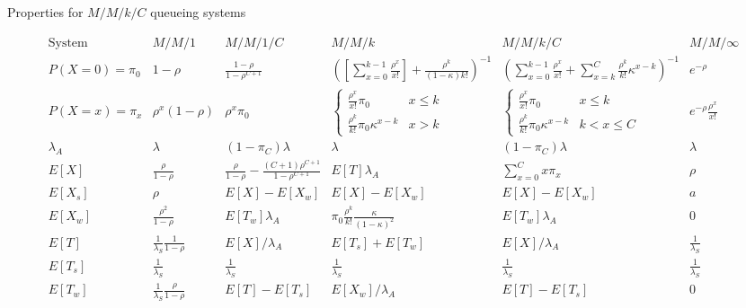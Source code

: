 \documentclass{article}
\newcommand{\utilization}{\rho}
\begin{document}
{\renewcommand{\arraystretch}{1.5}
\begin{sidewaystable}
\caption{Properties for $M/M/k/C$ queueing systems}
\label{tab:properties}
\[ \begin{array}{c|ccccc}
\mbox{System} & M/M/1 & M/M/1/C & M/M/k & M/M/k/C & M/M/\infty \\
\hline
P(X=0)=\pi_0 & 1-\utilization & \frac{1-\utilization}{1-\utilization^{C+1}} & 
\left(\left[\sum_{x=0}^{k-1} \frac{\utilization^x}{x!}\right] + \frac{\utilization^k}{(1-\kappa)k!}\right)^{-1} &
\left(\sum_{x=0}^{k-1} \frac{\utilization^x}{x!} + \sum_{x=k}^C \frac{\utilization^k}{k!}\kappa^{x-k} \right)^{-1} 
& e^{-\utilization} \\
P(X=x)=\pi_x & \utilization^x (1-\utilization) & \utilization^x \pi_0 & \left\{ \begin{array}{ll} \frac{\utilization^x}{x!}\pi_0 & x\le k \\ \frac{\utilization^k}{k!}\pi_0 \kappa^{x-k} & x>k \end{array} \right. 
& \left\{ \begin{array}{ll} \frac{\utilization^x}{x!}\pi_0 & x\le k \\ \frac{\utilization^k}{k!} \pi_0\kappa ^{x-k} & k<x\le C \end{array} \right.   & e^{-\utilization} \frac{\utilization^x}{x!} \\
\hline
\lambda_A & \lambda & (1-\pi_C)\lambda & \lambda & (1-\pi_C)\lambda & \lambda \\
\hline
E[X] & \frac{\utilization}{1-\utilization} & \frac{\utilization}{1-\utilization} - \frac{(C+1)\utilization^{C+1}}{1-\utilization^{C+1}} & E[T]\lambda_A & \sum_{x=0}^C x \pi_x & \utilization \\
E[X_s] & \utilization & E[X]-E[X_w] & E[X]-E[X_w] & E[X]-E[X_w] & a \\
E[X_w] & \frac{\utilization^2}{1-\utilization} & E[T_w] \lambda_A & \pi_0 \frac{\utilization^k}{k!} \frac{\kappa}{(1-\kappa)^2} & E[T_w] \lambda_A& 0 \\
E[T] & \frac{1}{\lambda_S}\frac{1}{1-\utilization} & E[X]/\lambda_A & E[T_s]+E[T_w] & E[X]/\lambda_A & \frac{1}{\lambda_S} \\
E[T_s] & \frac{1}{\lambda_S} & \frac{1}{\lambda_S} & \frac{1}{\lambda_S} & \frac{1}{\lambda_S} & \frac{1}{\lambda_S} \\
E[T_w] & \frac{1}{\lambda_S}\frac{\utilization}{1-\utilization} & E[T]-E[T_s] & E[X_w] / \lambda_A  & E[T]-E[T_s]& 0 \\
\end{array} \]
\end{sidewaystable}
}
\end{document}
